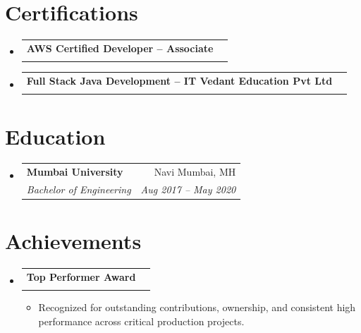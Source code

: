 \documentclass[letterpaper,11pt]{article}
\makeatletter
\newcommand{\resumeItem}[1]{
  \item\small{
    #1 \vspace{-2pt}
  }
}
\newcommand{\resumeSubheading}[4]{
  \vspace{-2pt}\item
  \begin{tabular*}{0.97\textwidth}[t]{l@{\extracolsep{\fill}}r}
    \textbf{#1} & #2 \\
    \textit{\small #3} & \textit{\small #4} \\
  \end{tabular*}\vspace{-7pt}
}
\newcommand{\resumeSubHeadingListStart}{\begin{itemize}[leftmargin=0.15in, label={}]}
\newcommand{\resumeSubHeadingListEnd}{\end{itemize}}
\newcommand{\resumeItemListStart}{\begin{itemize}}
\newcommand{\resumeItemListEnd}{\end{itemize}\vspace{-5pt}}
\makeatother
\begin{document}

\section{Certifications}
\resumeSubHeadingListStart

\resumeSubheading
    {AWS Certified Developer -- Associate}{}{}{}

\resumeSubheading
    {Full Stack Java Development -- IT Vedant Education Pvt Ltd}{}{}{}

\resumeSubHeadingListEnd


\section{Education}
\resumeSubHeadingListStart

\resumeSubheading
    {Mumbai University}{Navi Mumbai, MH}
    {Bachelor of Engineering}{Aug 2017 -- May 2020}

\resumeSubHeadingListEnd


\section{Achievements}
\resumeSubHeadingListStart

\resumeSubheading
    {Top Performer Award}{}{}{}
    \resumeItemListStart
        \resumeItem{Recognized for outstanding contributions, ownership, and consistent high performance across critical production projects.}
    \resumeItemListEnd

\resumeSubHeadingListEnd

\end{document}
